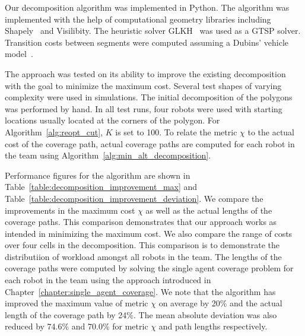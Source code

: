 \documentclass[../main.tex]{subfiles}
\begin{document}
Our decomposition algorithm was implemented in Python. The algorithm was implemented with the help of computational geometry libraries including Shapely~\cite{Shapely:13} and Visilibity\cite{VisiLibity:08}. The heuristic solver GLKH~\cite{helsgaun2000effective} was used as a GTSP solver. Transition costs between segments were computed assuming a Dubins' vehicle model~\cite{dubins1957curves}.

The approach was tested on its ability to improve the existing decomposition with the goal to minimize the maximum cost. Several test shapes of varying complexity were used in simulations. The initial decomposition of the polygons was performed by hand. In all test runs, four robots were used with starting locations usually located at the corners of the polygon. For Algorithm~\ref{alg:reopt_cut}, $K$ is set to 100. To relate the metric $\chi$ to the actual cost of the coverage path, actual coverage paths are computed for each robot in the team using Algorithm~\ref{alg:min_alt_decomposition}.

Performance figures for the algorithm are shown in Table~\ref{table:decomposition_improvement_max} and Table~\ref{table:decomposition_improvement_deviation}. We compare the improvements in the maximum cost $\chi$ as well as the actual lengths of the coverage paths. This comparison demonstrates that our approach works as intended in minimizing the maximum cost. We also compare the range of costs over four cells in the decomposition. This comparison is to demonstrate the distributiion of workload amongst all robots in the team. The lengths of the coverage paths were computed by solving the single agent coverage problem for each robot in the team using the approach introduced in Chapter~\ref{chapter:single_agent_coverage}. We note that the algorithm has improved the maximum value of metric $\chi$ on average by 20\% and the actual length of the coverage path by 24\%. The mean absolute deviation was also reduced by 74.6\% and 70.0\% for metric $\chi$ and path lengths respectively.
\end{document}
